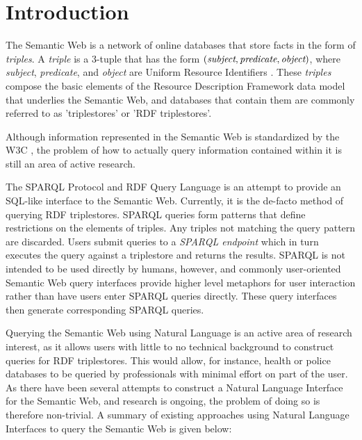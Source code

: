 \documentclass[../main.tex]{subfiles}
\begin{document}
\chapter{Introduction}


The Semantic Web is a network of online databases that store facts in the form of {\em triples}.  A {\em triple} is a 3-tuple that has the form $(\text{\em subject}, \text{\em predicate}, \text{\em object})$, where {\em subject}, {\em predicate}, and {\em object} are Uniform Resource Identifiers \cite{w3csemanticweb}.  These {\em triples} compose the basic elements of the Resource Description Framework data model that underlies the Semantic Web, and databases that contain them are commonly referred to as 'triplestores' or 'RDF triplestores'.


Although information represented in the Semantic Web is standardized by the W3C \cite{w3csemanticweb}, the problem of how to actually query information contained within it is still an area of active research.

The SPARQL Protocol and RDF Query Language is an attempt to provide an SQL-like interface to the Semantic Web.  Currently, it is the de-facto method of querying RDF triplestores.  SPARQL queries form patterns that define restrictions on the elements of triples.  Any triples not matching the query pattern are discarded.  Users submit queries to a {\em SPARQL endpoint} which in turn executes the query against a triplestore and returns the results.  SPARQL is not intended to be used directly by humans, however, and commonly user-oriented Semantic Web query interfaces provide higher level metaphors for user interaction rather than have users enter SPARQL queries directly.  These query interfaces then generate corresponding SPARQL queries.

Querying the Semantic Web using Natural Language is an active area of research interest, as it allows users with little to no technical background to construct queries for RDF triplestores.  This would allow, for instance, health or police databases to be queried by professionals with minimal effort on part of the user.  As there have been several attempts to construct a Natural Language Interface for the Semantic Web, and research is ongoing, the problem of doing so is therefore non-trivial.  A summary of existing approaches using Natural Language Interfaces to query the Semantic Web is given below:
\end{document}
